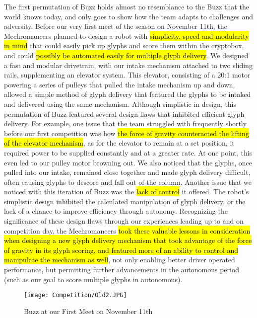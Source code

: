 The first permutation of Buzz holds almost no resemblance to the Buzz that the world knows today, and only goes to show how the team adapts to challenges and adversity. Before our very first meet of the season on November 11th, the Mechromancers planned to design a robot with \hl{simplicity, speed and modularity in mind} that could easily pick up glyphs and score them within the cryptobox, and could \hl{possibly be automated easily for multiple glyph delivery}. We designed a fast and modular drivetrain, with our intake mechanism attached to two sliding rails, supplementing an elevator system. This elevator, consisting of a 20:1 motor powering a series of pulleys that pulled the intake mechanism up and down, allowed a simple method of glyph delivery that featured the glyphs to be intaked and delivered using the same mechanism. Although simplistic in design, this permutation of Buzz featured several design flaws that inhibited efficient glyph delivery. For example, one issue that the team struggled with frequently shortly before our first competition was how \hl{the force of gravity counteracted the lifting of the elevator mechanism}, as for the elevator to remain at a set position, it required power to be supplied constantly and at a greater rate. At one point, this even led to our pulley motor browning out. We also noticed that the glyphs, once pulled into our intake, remained close together and made glyph delivery difficult, often causing glyphs to descore and fall out of the column. Another issue that we noticed with this iteration of Buzz was the \hl{lack of control} it offered. The robot's simplistic design inhibited the calculated manipulation of glyph delivery, or the lack of a chance to improve efficiency through autonomy. Recognizing the significance of these design flaws through our experiences leading up to and on competition day, the Mechromancers \hl{took these valuable lessons in consideration when designing a new glyph delivery mechanism that took advantage of the force of gravity in its glyph scoring, and featured more of an ability to control and manipulate the mechanism as well}, not only enabling better driver operated performance, but permitting further advancements in the autonomous period (such as our goal to score multiple glyphs in autonomous). 
  \begin{figure}[htp]
  \centering
    \texttt{[image: Competition/Old2.JPG]}
   \caption{Buzz at our First Meet on November 11th}
   \label{fig:Nov11}
  \end{figure}
